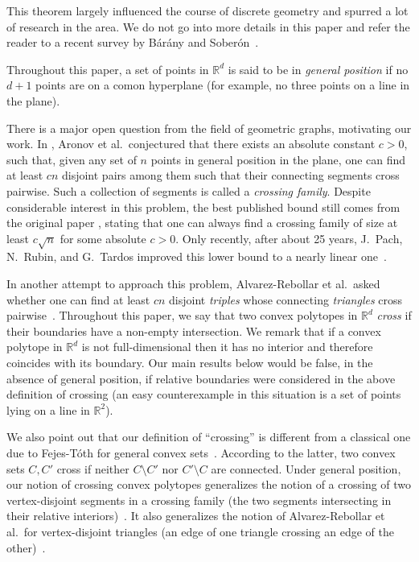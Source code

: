 \documentclass[english,a4paper,nolineno]{lipics-v2019}
\newcommand{\R}{\mathbb{R}}
\begin{document}
This theorem largely influenced the course of discrete geometry and spurred a lot of research in the area. We do not go into more details in this paper and refer the reader to a recent survey by B{\'{a}}r{\'{a}}ny and Sober{\'{o}}n~\cite{Barany2018}.

Throughout this paper, a set of points in $\R^d$ is said to be in \emph{general position} if no $d+1$ points are on a comon hyperplane (for example, no three points on a line in the plane).  

There is a major open question from the field of geometric graphs, motivating our work. In \cite{Aronov1994}, Aronov et al.\  conjectured that there exists an absolute constant $c>0$, such that, given any set of $n$ points in general position in the plane, one can find at least $cn$ disjoint pairs among them such that their connecting segments cross pairwise. Such a collection of segments is called a \emph{crossing family}. Despite considerable interest in this problem, the best published bound still comes from the original paper \cite{Aronov1994}, stating that one can always find a crossing family of size at least $c\sqrt n$ for some absolute $c>0$.
Only recently, after about 25 years, J.~Pach, N.~Rubin, and G.~Tardos improved this lower bound to a nearly linear one~\cite{PRT19_crossing}.

In another attempt to approach this problem, Alvarez-Rebollar et al.\ asked whether one can find at least $cn$ disjoint \emph{triples} whose connecting \emph{triangles} cross pairwise~\cite{RLU2016_crossingFam}. Throughout this paper, we say that two convex polytopes in $\R^d$ \emph{cross} if their boundaries have a non-empty intersection. We remark that if a convex polytope in $\R^d$ is not full-dimensional then it has no interior and therefore coincides with its boundary. Our main results below would be false, in the absence of general position, if relative boundaries were considered in the above definition of crossing (an easy counterexample in this situation is a set of points lying on a line in $\R^2$). 

We also point out that our definition of ``crossing'' is different from a classical one due to Fejes-T\'oth for general convex sets~\cite{FT67}. According to the latter, two convex sets $C,C'$ cross if neither $C\setminus C'$ nor $C'\setminus C$ are connected. Under general position, our notion of crossing convex polytopes generalizes the notion of a crossing of two vertex-disjoint segments in a crossing family (the two segments intersecting in their relative interiors)~\cite{Aronov1994}. It also generalizes the notion of Alvarez-Rebollar et al.\ for vertex-disjoint triangles (an edge of one triangle crossing an edge of the other)~\cite{RLU2016_crossingFam}.
\end{document}
